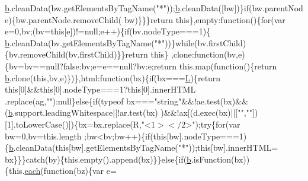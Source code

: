 \begin{DoxyCode}
      \hyperlink{docs_2_programmer's_manual_2html_2jquery_8js_aa4026ad5544b958e54ce5e106fa1c805}{b}.cleanData(bw.getElementsByTagName(\textcolor{stringliteral}{"*"}));\hyperlink{docs_2_programmer's_manual_2html_2jquery_8js_aa4026ad5544b958e54ce5e106fa1c805}{b}.cleanData([bw])\}\textcolor{keywordflow}{if}(bw.parentNode)\{bw.parentNode.removeChild(
      bw)\}\}\}\textcolor{keywordflow}{return} \textcolor{keyword}{this}\},empty:\textcolor{keyword}{function}()\{\textcolor{keywordflow}{for}(var e=0,bv;(bv=\textcolor{keyword}{this}[e])!=null;e++)\{\textcolor{keywordflow}{if}(bv.nodeType===1)\{
      \hyperlink{docs_2_programmer's_manual_2html_2jquery_8js_aa4026ad5544b958e54ce5e106fa1c805}{b}.cleanData(bv.getElementsByTagName(\textcolor{stringliteral}{"*"}))\}\textcolor{keywordflow}{while}(bv.firstChild)\{bv.removeChild(bv.firstChild)\}\}\textcolor{keywordflow}{return} \textcolor{keyword}{this}\}
      ,clone:\textcolor{keyword}{function}(bv,e)\{bv=bv==null?\textcolor{keyword}{false}:bv;e=e==null?bv:e;\textcolor{keywordflow}{return} this.map(\textcolor{keyword}{function}()\{\textcolor{keywordflow}{return} 
      \hyperlink{docs_2_programmer's_manual_2html_2jquery_8js_aa4026ad5544b958e54ce5e106fa1c805}{b}.clone(\textcolor{keyword}{this},bv,e)\})\},html:\textcolor{keyword}{function}(bx)\{\textcolor{keywordflow}{if}(bx===\hyperlink{docs_2_programmer's_manual_2html_2jquery_8js_a38ee4c0b5f4fe2a18d0c783af540d253}{L})\{\textcolor{keywordflow}{return} \textcolor{keyword}{this}[0]&&\textcolor{keyword}{this}[0].nodeType===1?\textcolor{keyword}{this}[0].innerHTML
      .replace(ag,\textcolor{stringliteral}{""}):null\}\textcolor{keywordflow}{else}\{\textcolor{keywordflow}{if}(typeof bx===\textcolor{stringliteral}{"string"}&&!ae.test(bx)&&(\hyperlink{docs_2_programmer's_manual_2html_2jquery_8js_aa4026ad5544b958e54ce5e106fa1c805}{b}.support.leadingWhitespace||!ar.test(bx)
      )&&!ax[(d.exec(bx)||[\textcolor{stringliteral}{""},\textcolor{stringliteral}{""}])[1].toLowerCase()])\{bx=bx.replace(R,\textcolor{stringliteral}{"<$1></$2>"});\textcolor{keywordflow}{try}\{\textcolor{keywordflow}{for}(var bw=0,bv=this.length
      ;bw<bv;bw++)\{\textcolor{keywordflow}{if}(\textcolor{keyword}{this}[bw].nodeType===1)\{\hyperlink{docs_2_programmer's_manual_2html_2jquery_8js_aa4026ad5544b958e54ce5e106fa1c805}{b}.cleanData(\textcolor{keyword}{this}[bw].getElementsByTagName(\textcolor{stringliteral}{"*"}));\textcolor{keyword}{this}[bw].innerHTML=
      bx\}\}\}\textcolor{keywordflow}{catch}(by)\{this.empty().append(bx)\}\}\textcolor{keywordflow}{else}\{\textcolor{keywordflow}{if}(\hyperlink{docs_2_programmer's_manual_2html_2jquery_8js_aa4026ad5544b958e54ce5e106fa1c805}{b}.isFunction(bx))\{this.\hyperlink{docs_2_programmer's_manual_2html_2jquery_8js_a871ff39db627c54c710a3e9909b8234c}{each}(\textcolor{keyword}{function}(bz)\{var e=

\end{DoxyCode}
